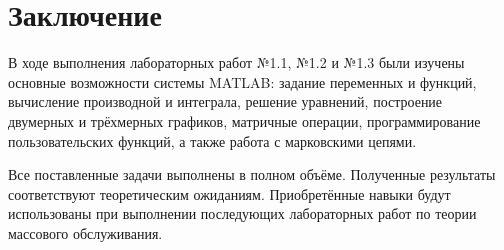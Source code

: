 \chapter{Заключение}
\label{ch:concl}

    В ходе выполнения лабораторных работ №1.1, №1.2 и №1.3 были изучены основные возможности системы MATLAB: задание переменных и функций, вычисление производной и интеграла, решение уравнений, построение двумерных и трёхмерных графиков, матричные операции, программирование пользовательских функций, а также работа с марковскими цепями.

    Все поставленные задачи выполнены в полном объёме. Полученные результаты соответствуют теоретическим ожиданиям. Приобретённые навыки будут использованы при выполнении последующих лабораторных работ по теории массового обслуживания.

\endinput